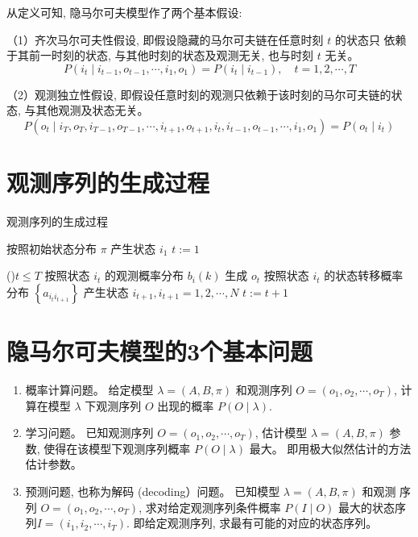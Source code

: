 从定义可知, 隐马尔可夫模型作了两个基本假设:

（1）齐次马尔可夫性假设, 即假设隐藏的马尔可夫链在任意时刻 $ t $ 的状态只 依赖于其前一时刻的状态, 与其他时刻的状态及观测无关, 也与时刻 $ t $ 无关。
$$
P\left(i_{t} \mid i_{t-1}, o_{t-1}, \cdots, i_{1}, o_{1}\right)=P\left(i_{t} \mid i_{t-1}\right), \quad t=1,2, \cdots, T
$$

（2）观测独立性假设, 即假设任意时刻的观测只依赖于该时刻的马尔可夫链的状态, 与其他观测及状态无关。
$$
P\left(o_{t} \mid i_{T}, o_{T}, i_{T-1}, o_{T-1}, \cdots, i_{t+1}, o_{t+1}, i_{t}, i_{t-1}, o_{t-1}, \cdots, i_{1}, o_{1}\right)=P\left(o_{t} \mid i_{t}\right)
$$

\section{观测序列的生成过程}

\begin{algorithm}[htbp]
    \caption{观测序列的生成过程}

    按照初始状态分布 $ \pi $ 产生状态 $ i_{1} $\;
    $ t:=1 $\;

    \While(){$t \le T$}{
        按照状态 $ i_{t} $ 的观测概率分布 $ b_{i}(k) $ 生成 $ o_{t} $\;
        按照状态 $ i_{t} $ 的状态转移概率分布 $ \left\{a_{i_{t} i_{t+1}}\right\} $ 产生状态 $ i_{t+1}, i_{t+1}=1,2, \cdots, N $\; 
        $t := t + 1$\;
    }
\end{algorithm}

\section{隐马尔可夫模型的3个基本问题}

\begin{enumerate}
    \item 概率计算问题。 给定模型 $ \lambda=(A, B, \pi) $ 和观测序列 $ O=\left(o_{1}, o_{2}, \cdots, o_{T}\right) $, 计 算在模型 $ \lambda $ 下观测序列 $ O $ 出现的概率 $ P(O \mid \lambda) $.
    \item 学习问题。 已知观测序列 $ O=\left(o_{1}, o_{2}, \cdots, o_{T}\right) $, 估计模型 $ \lambda=(A, B, \pi) $ 参数, 使得在该模型下观测序列概率 $ P(O \mid \lambda) $ 最大。 即用极大似然估计的方法估计参数。
    \item 预测问题, 也称为解码 (decoding）问题。 已知模型 $ \lambda=(A, B, \pi) $ 和观测 序列 $ O=\left(o_{1}, o_{2}, \cdots, o_{T}\right) $, 求对给定观测序列条件概率 $ P(I \mid O) $ 最大的状态序列$ I=\left(i_{1}, i_{2}, \cdots, i_{T}\right) $. 即给定观测序列, 求最有可能的对应的状态序列。
\end{enumerate}

